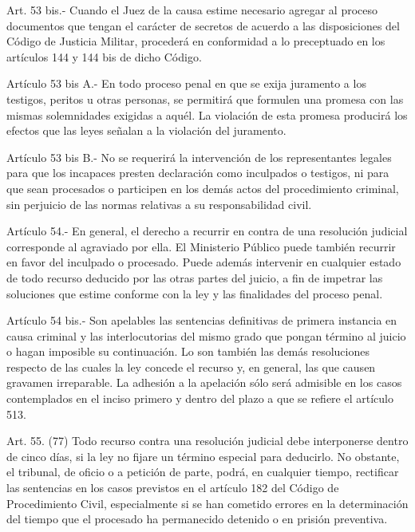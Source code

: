     Art. 53 bis.- Cuando el Juez de la causa estime necesario agregar al proceso documentos que tengan el carácter de secretos de acuerdo a las disposiciones del Código de Justicia Militar, procederá en conformidad a lo preceptuado en los artículos 144 y 144 bis de dicho Código.

    Artículo 53 bis A.- En todo proceso penal en que se exija juramento a los testigos, peritos u otras personas, se permitirá que formulen una promesa con las mismas solemnidades exigidas a aquél. La violación de esta promesa producirá los efectos que las leyes señalan a la violación del juramento.

    Artículo 53 bis B.- No se requerirá la intervención de los representantes legales para que los incapaces presten declaración como inculpados o testigos, ni para que sean procesados o participen en los demás actos del procedimiento criminal, sin perjuicio de las normas relativas a su responsabilidad civil.

    Artículo 54.- En general, el derecho a recurrir en contra de una resolución judicial corresponde al agraviado por ella.
    El Ministerio Público puede también recurrir en favor del inculpado o procesado. Puede además intervenir en cualquier estado de todo recurso deducido por las otras partes del juicio, a fin de impetrar las soluciones que estime conforme con la ley y las finalidades del proceso penal.



    Artículo 54 bis.- Son apelables las sentencias definitivas de primera instancia en causa criminal y las interlocutorias del mismo grado que pongan término al juicio o hagan imposible su continuación.
    Lo son también las demás resoluciones respecto de las cuales la ley concede el recurso y, en general, las que causen gravamen irreparable.
    La adhesión a la apelación sólo será admisible en los casos contemplados en el inciso primero y dentro del plazo a que se refiere el artículo 513.

    Art. 55. (77) Todo recurso contra una resolución judicial debe interponerse dentro de cinco días, si la ley no fijare un término especial para deducirlo.
    No obstante, el tribunal, de oficio o a petición de parte, podrá, en cualquier tiempo, rectificar las sentencias en los casos previstos en el artículo 182 del Código de Procedimiento Civil, especialmente si se han cometido errores en la determinación del tiempo que el procesado ha permanecido detenido o en prisión preventiva.


